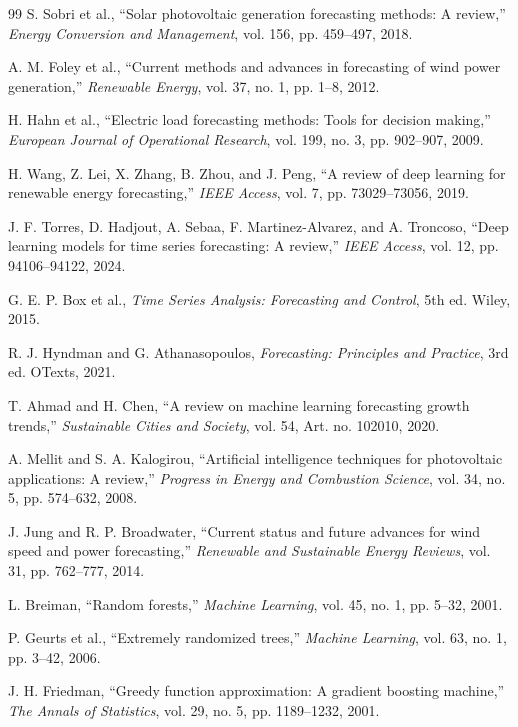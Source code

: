 \documentclass{ieeeaccess}
\begin{document}
\begin{thebibliography}{99}
S. Sobri et al., ``Solar photovoltaic generation forecasting methods: A review,'' \emph{Energy Conversion and Management}, vol. 156, pp. 459--497, 2018.

A. M. Foley et al., ``Current methods and advances in forecasting of wind power generation,'' \emph{Renewable Energy}, vol. 37, no. 1, pp. 1--8, 2012.

H. Hahn et al., ``Electric load forecasting methods: Tools for decision making,'' \emph{European Journal of Operational Research}, vol. 199, no. 3, pp. 902--907, 2009.

H. Wang, Z. Lei, X. Zhang, B. Zhou, and J. Peng, ``A review of deep learning for renewable energy forecasting,'' \emph{IEEE Access}, vol. 7, pp. 73029--73056, 2019.

J. F. Torres, D. Hadjout, A. Sebaa, F. Martinez-Alvarez, and A. Troncoso, ``Deep learning models for time series forecasting: A review,'' \emph{IEEE Access}, vol. 12, pp. 94106--94122, 2024.

G. E. P. Box et al., \emph{Time Series Analysis: Forecasting and Control}, 5th ed. Wiley, 2015.

R. J. Hyndman and G. Athanasopoulos, \emph{Forecasting: Principles and Practice}, 3rd ed. OTexts, 2021.

T. Ahmad and H. Chen, ``A review on machine learning forecasting growth trends,'' \emph{Sustainable Cities and Society}, vol. 54, Art. no. 102010, 2020.

A. Mellit and S. A. Kalogirou, ``Artificial intelligence techniques for photovoltaic applications: A review,'' \emph{Progress in Energy and Combustion Science}, vol. 34, no. 5, pp. 574--632, 2008.

J. Jung and R. P. Broadwater, ``Current status and future advances for wind speed and power forecasting,'' \emph{Renewable and Sustainable Energy Reviews}, vol. 31, pp. 762--777, 2014.

L. Breiman, ``Random forests,'' \emph{Machine Learning}, vol. 45, no. 1, pp. 5--32, 2001.

P. Geurts et al., ``Extremely randomized trees,'' \emph{Machine Learning}, vol. 63, no. 1, pp. 3--42, 2006.

J. H. Friedman, ``Greedy function approximation: A gradient boosting machine,'' \emph{The Annals of Statistics}, vol. 29, no. 5, pp. 1189--1232, 2001.


\end{thebibliography}
\end{document}
